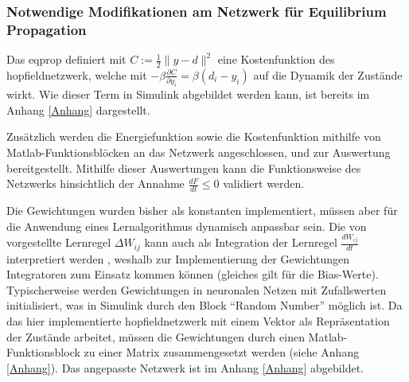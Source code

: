 \subsubsection{Notwendige Modifikationen am Netzwerk für Equilibrium Propagation}

Das \gls{eqprop} definiert mit \(C:=\frac{1}{2}\| y-d\| ^2\) eine Kostenfunktion des \gls{hopfieldnetzwerk}, welche mit \(-\beta\frac{\partial C}{\partial y_i}=\beta(d_i-y_i)\) auf die Dynamik der Zustände wirkt. Wie dieser Term in Simulink abgebildet werden kann, ist bereits im Anhang \ref{Anhang} dargestellt.

Zusätzlich werden die Energiefunktion sowie die Kostenfunktion mithilfe von Matlab-Funktionsblöcken an das Netzwerk angeschlossen, und zur Auswertung bereitgestellt. Mithilfe dieser Auswertungen kann die Funktionsweise des Netzwerks hinsichtlich der Annahme \(\frac{dF}{dt}\leq{0}\) \cite[vgl. S. 3]{Scellier2017} validiert werden.

Die Gewichtungen wurden bisher als konstanten implementiert, müssen aber für die Anwendung eines Lernalgorithmus dynamisch anpassbar sein. Die von \citeauthor{Scellier2017} vorgestellte Lernregel \(\Delta W_{ij}\) kann auch als Integration der Lernregel \(\frac{dW_{ij}}{dt}\) interpretiert werden \cite[vgl. S. 5]{Scellier2017}, weshalb zur Implementierung der Gewichtungen Integratoren zum Einsatz kommen können (gleiches gilt für die Bias-Werte). Typischerweise werden Gewichtungen in neuronalen Netzen mit Zufallswerten initialisiert, was in Simulink durch den Block "`Random Number"' möglich ist. Da das hier implementierte \gls{hopfieldnetzwerk} mit einem Vektor als Repräsentation der Zustände arbeitet, müssen die Gewichtungen durch einen Matlab-Funktionsblock zu einer Matrix zusammengesetzt werden (siehe Anhang \ref{Anhang}). Das angepasste Netzwerk ist im Anhang \ref{Anhang} abgebildet.
